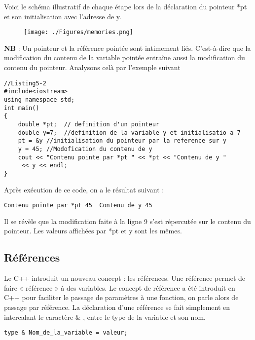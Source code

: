 \documentclass[a4paper, oneside,11pt]{book}
\begin{document}
Voici le sch\'ema illustratif de chaque \'etape lors de la d\'eclaration du pointeur *pt et son initialisation avec l'adresse de y.

\begin{figure}[hhhh]
\begin{center}
\texttt{[image: ./Figures/memories.png]}
\end{center}
\end{figure}

\textbf{NB} : Un pointeur et la r\'ef\'erence point\'ee sont intimement li\'es. C'est-\`a-dire que la modification du contenu de la variable point\'ee entra\^ine aussi
la modification du contenu du pointeur. Analysons cel\` a par l'exemple suivant

\begin{lstlisting}
//Listing5-2
#include<iostream>
using namespace std;
int main()
{
    double *pt;  // definition d'un pointeur
    double y=7;  //definition de la variable y et initialisatio a 7
    pt = &y //initialisation du pointeur par la reference sur y
    y = 45; //Modofication du contenu de y
    cout << "Contenu pointe par *pt " << *pt << "Contenu de y "
     << y << endl;
}
\end{lstlisting}
Apr\`es ex\'ecution de ce code, on a le r\'esultat suivant :
\begin{lstlisting}
Contenu pointe par *pt 45  Contenu de y 45
\end{lstlisting}

Il se r\'ev\`ele que la modification faite \`a la ligne 9 s'est r\'epercut\'ee sur le contenu du pointeur. Les valeurs affich\'ees par *pt et y sont les m\^emes.


\subsection{R\'ef\'erences}


Le C++ introduit un nouveau concept : les r\'ef\'erences. Une r\'ef\'erence permet de
faire « r\'ef\'erence » \`a des variables. Le concept de r\'ef\'erence a \'et\'e introduit en C++ pour faciliter
le passage de param\`etres \`a une fonction, on parle alors de passage par r\'ef\'erence. La d\'eclaration
d'une r\'ef\'erence se fait simplement en intercalant le caract\`ere \& , entre le type de la variable et son nom.

\begin{lstlisting}
type & Nom_de_la_variable = valeur;
\end{lstlisting}
\end{document}
